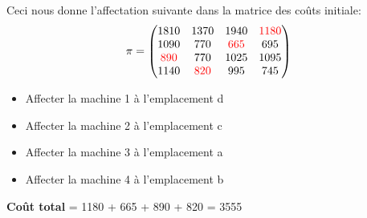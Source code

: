 \documentclass{article}
\begin{document}
Ceci nous donne l'affectation suivante dans la matrice des coûts initiale:
$$\pi=\begin{pmatrix}
1810 & 1370 & 1940 & \textcolor{red}{1180} \\
1090 & 770 & \textcolor{red}{665} & 695\\
\textcolor{red}{890} & 770 & 1025 & 1095\\
1140 & \textcolor{red}{820} & 995 & 745
\end{pmatrix}$$

\begin{itemize}
    \item Affecter la machine 1 à l'emplacement d 
    \item Affecter la machine 2 à l'emplacement c
    \item Affecter la machine 3 à l'emplacement a 
    \item Affecter la machine 4 à l'emplacement b 
\end{itemize}

\textbf{Coût total} = 1180 + 665 + 890 + 820 = 3555
\end{document}
